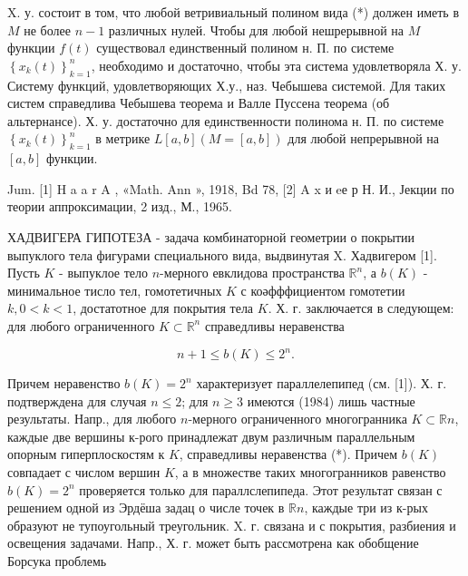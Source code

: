 \documentclass[10pt]{article}
\begin{document}
X. у. состоит в том, что любой ветривиальный полином вида (*) должен иметь в $M$ не более $n-1$ различных нулей. Чтобы для любой нешрерывной на $M$ функции $f(t)$ существовал единственный полином н. П. по системе $\left\{x_{k}(t)\right\}_{k=1}^{n}$, необходимо и достаточно, чтобы эта система удовлетворяла Х. у. Систему функций, удовлетворяющих Х.у., наз. Чебышева системой. Для таких систем справедлива Чебышева теорема и Валле Пуссена теорема (об альтернансе). Х. у. достаточно для единственности полинома н. П. по системе $\left\{x_{k}(t)\right\}_{k=1}^{n}$ в метрике $L[a, b](M=[a, b])$ для любой непрерывной на $[a, b]$ функции.



Jum. [1] H a a r A , «Math. Ann », 1918, Bd 78, [2] A x и eе р Н. И., Јекции по теории аппроксимации, 2 изд., М., 1965.



ХАДВИГЕРА ГИПОТЕЗА - задача комбинаторной геометрии о покрытии выпуклого тела фигурами специального вида, выдвинутая X. Хадвигером [1]. Пусть $K$ - выпуклое тело $n$-мерного евклидова пространства $\mathbb{R}^{n}$, а $b(K)$ - минимальное тисло тел, гомотетичных $K$ с коәфффициентом гомотетии $k, 0<k<1$, достатотное для покрытия тела $K$. Х. г. заключается в следующем: для любого ограниченного $K \subset \mathbb{R}^{n}$ справедливы неравенства



\[

n+1 \leqslant b(K) \leqslant 2^{n} .

\]



Причем неравенство $b(K)=2^{n}$ характеризует параллелепипед (см. [1]). Х. г. подтверждена для случая $n \leqslant 2$; для $n \geqslant 3$ имеются (1984) лишь частные результаты. Напр., для любого $n$-мерного ограниченного многогранника $K \subset \mathbb{R} n$, каждые две вершины к-рого принадлежат двум различным параллельным опорным гиперплоскостям к $K$, справедливы неравенства (*). Причем $b(K)$ совпадает с числом вершин $K$, а в множестве таких многогранников равенство $b(K)=2^{n}$ проверяется только для параллслепипеда. Этот результат связан с решением одной из Эрдёша задац о числе точек в $\mathbb{R} n$, каждые три из к-рых образуют не тупоугольный треугольник. X. г. связана и с покрытия, разбиения и освещения задачами. Напр., Х. г. может быть рассмотрена как обобщение Борсука проблемь
\end{document}
